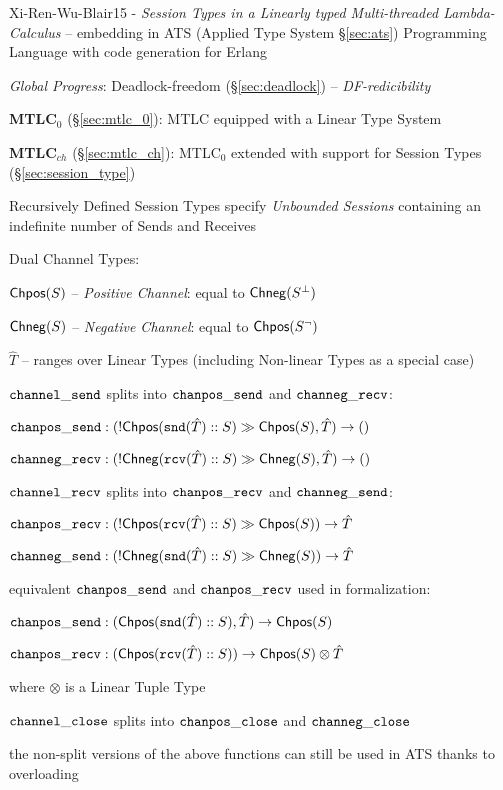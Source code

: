 Xi-Ren-Wu-Blair15 - \emph{Session Types in a Linearly typed
  Multi-threaded Lambda-Calculus} -- embedding in ATS (Applied Type
System \S\ref{sec:ats}) Programming Language with code generation for
Erlang

\emph{Global Progress}: Deadlock-freedom (\S\ref{sec:deadlock}) --
\emph{DF-redicibility}

\fist \textbf{MTLC$_0$} (\S\ref{sec:mtlc_0}): MTLC equipped with a
Linear Type System

\fist \textbf{MTLC$_{ch}$} (\S\ref{sec:mtlc_ch}): MTLC$_0$ extended
with support for Session Types (\S\ref{sec:session_type})

Recursively Defined Session Types specify \emph{Unbounded Sessions}
containing an indefinite number of Sends and Receives


Dual Channel Types:

$\mathsf{Chpos}(S)$ -- \emph{Positive Channel}: equal to $\mathsf{Chneg}(S^\bot)$

$\mathsf{Chneg}(S)$ -- \emph{Negative Channel}: equal to $\mathsf{Chpos}(S^\neg)$

$\hat{T}$ -- ranges over Linear Types (including Non-linear Types as a
special case)

$\mathtt{channel\_send}$ splits into $\mathtt{chanpos\_send}$ and $\mathtt{channeg\_recv}$:

$\mathtt{chanpos\_send} : (!\mathsf{Chpos}(\mathtt{snd}(\hat{T})::S) \gg \mathsf{Chpos}(S), \hat{T})
\rightarrow \mathsf{()}$

$\mathtt{channeg\_recv} : (!\mathsf{Chneg}(\mathtt{rcv}(\hat{T})::S) \gg \mathsf{Chneg}(S), \hat{T})
\rightarrow \mathsf{()}$

$\mathtt{channel\_recv}$ splits into $\mathtt{chanpos\_recv}$ and $\mathtt{channeg\_send}$:

$\mathtt{chanpos\_recv} : (!\mathsf{Chpos}(\mathtt{rcv}(\hat{T})::S) \gg \mathsf{Chpos}(S))
\rightarrow \hat{T}$

$\mathtt{channeg\_send} : (!\mathsf{Chneg}(\mathtt{snd}(\hat{T})::S) \gg \mathsf{Chneg}(S))
\rightarrow \hat{T}$

equivalent $\mathtt{chanpos\_send}$ and $\mathtt{chanpos\_recv}$ used in formalization:

$\mathtt{chanpos\_send} : (\mathsf{Chpos}(\mathtt{snd}(\hat{T})::S), \hat{T}) \rightarrow \mathsf{Chpos}(S)$

$\mathtt{chanpos\_recv} : (\mathsf{Chpos}(\mathtt{rcv}(\hat{T})::S)) \rightarrow \mathsf{Chpos}(S)
\otimes \hat{T}$

where $\otimes$ is a Linear Tuple Type

$\mathtt{channel\_close}$ splits into $\mathtt{chanpos\_close}$ and $\mathtt{channeg\_close}$

the non-split versions of the above functions can still be used in ATS
thanks to overloading



